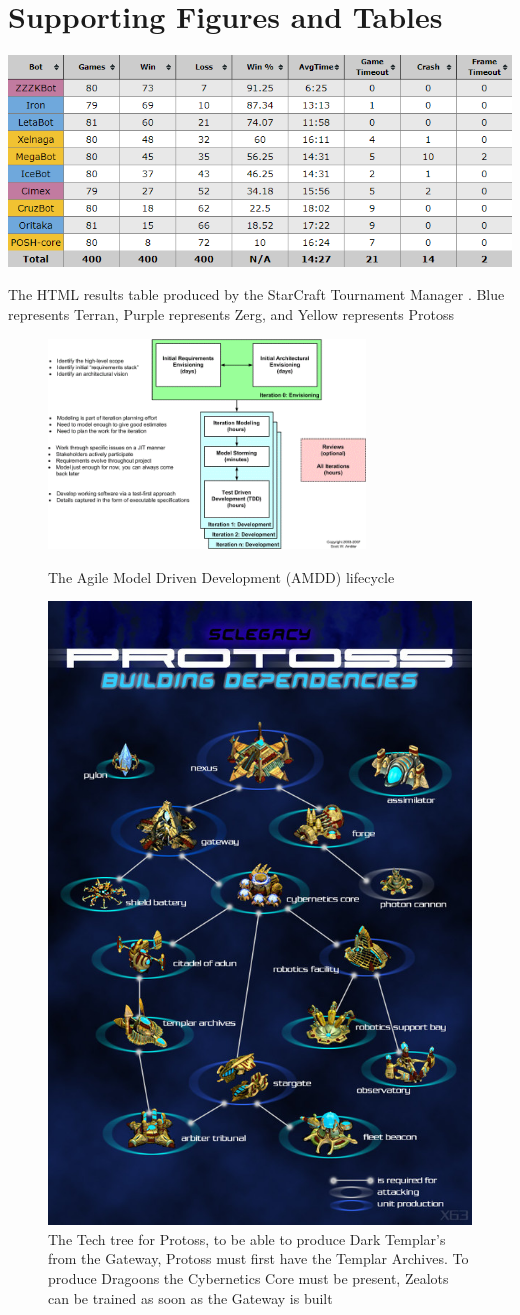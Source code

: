 \documentclass[journal]{IEEEtran}
\begin{document}
	\section{Supporting Figures and Tables}
\begin{table}[]
		\centering
		\includegraphics[width=\textwidth]{STMResultsWithBot}
		\caption{The HTML results table produced by the StarCraft Tournament Manager \cite{Tournament}. Blue represents Terran, Purple represents Zerg, and Yellow represents Protoss}
		\label{Table2}
	\end{table}
	\begin{figure}
		\centering
		\includegraphics[width=0.75\textwidth]{AMDD}
		\centering\caption{The Agile Model Driven Development (AMDD) lifecycle \cite{AMDD}}
		\label{Fig10}
		\centering
		\includegraphics[width= 0.5 \textwidth]{ProtossTechTree}
		\centering\caption{The Tech tree for Protoss, to be able to produce Dark Templar's from the Gateway, Protoss must first have the Templar Archives. To produce Dragoons the Cybernetics Core must be present, Zealots can be trained as soon as the Gateway is built \cite{Tech}}
		\label{Fig11}
	\end{figure}
\end{document}
